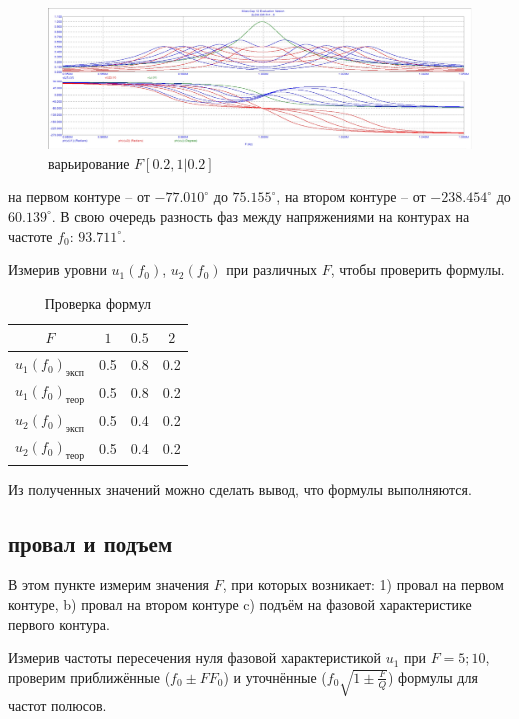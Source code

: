 \documentclass[a4paper, 14pt]{extarticle}%
\begin{document}
\begin{figure}[h!]
	\centering
			\includegraphics[width=1.1\linewidth]{1.2varF2.jpg}
            \caption{варьирование $F [0.2, 1|0.2]$}
	\label{A}
\end{figure}

\newpage

на первом контуре -- от $-77.010^{\circ}$ до $75.155^{\circ}$, на втором контуре -- от $-238.454^{\circ}$ до $60.139^{\circ}$. В свою очередь разность фаз между напряжениями на контурах на частоте $f_0$: $93.711^{\circ}$.

Измерив уровни $u_1(f_0)$, $u_2(f_0)$ при различных $F$, чтобы проверить формулы.
 

\begin{table}[h]
	\centering
	\begin{tabular}{c|c|c|c}
		$F$                         & $1$ & $0.5$ & $2$ \\ \hline
		$u_1(f_0)_{\text{эксп}}$          & 0.5 & 0.8   & 0.2 \\ \hline
		$u_1(f_0)_{\text{теор}}$ & 0.5 & 0.8   & 0.2 \\ \hline \hline
		$u_2(f_0)_{\text{эксп}}$          & 0.5 & 0.4   & 0.2 \\ \hline
		$u_2(f_0)_{\text{теор}}$ & 0.5 & 0.4   & 0.2 \\ 
	\end{tabular}
	\caption{Проверка формул}
\end{table}

Из полученных значений можно сделать вывод, что формулы выполняются.


\subsection{провал и подъем}

В этом пункте измерим значения $F$, при которых возникает: 1) провал на первом контуре, b) провал на втором контуре c) подъём на фазовой характеристике первого контура.

Измерив частоты пересечения нуля фазовой характеристикой $u_1$ при $F = 5;10$, проверим приближённые ($f_0\pm FF_0$) и уточнённые ($f_0\sqrt{1\pm\frac{F}{Q}}$) формулы для частот полюсов.
\end{document}
